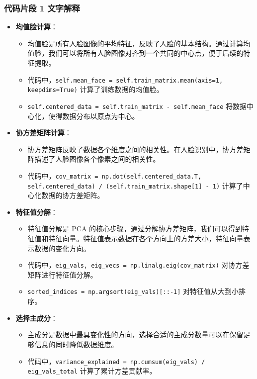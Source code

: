 \documentclass{article}
\begin{document}
\subsubsection{代码片段 1 文字解释}
\begin{itemize}
    \item \textbf{均值脸计算}：
    \begin{itemize}
        \item 均值脸是所有人脸图像的平均特征，反映了人脸的基本结构。通过计算均值脸，我们可以将所有人脸图像对齐到一个共同的中心点，便于后续的特征提取。
        \item 代码中，\texttt{self.mean\_face = self.train\_matrix.mean(axis=1, keepdims=True)} 计算了训练数据的均值脸。
        \item \texttt{self.centered\_data = self.train\_matrix - self.mean\_face} 将数据中心化，使得数据分布以原点为中心。
    \end{itemize}
    \item \textbf{协方差矩阵计算}：
    \begin{itemize}
        \item 协方差矩阵反映了数据各个维度之间的相关性。在人脸识别中，协方差矩阵描述了人脸图像各个像素之间的相关性。
        \item 代码中，\texttt{cov\_matrix = np.dot(self.centered\_data.T, self.centered\_data) / (self.train\_matrix.shape[1] - 1)} 计算了中心化数据的协方差矩阵。
    \end{itemize}
    \item \textbf{特征值分解}：
    \begin{itemize}
        \item 特征值分解是 PCA 的核心步骤，通过分解协方差矩阵，我们可以得到特征值和特征向量。特征值表示数据在各个方向上的方差大小，特征向量表示数据的变化方向。
        \item 代码中，\texttt{eig\_vals, eig\_vecs = np.linalg.eig(cov\_matrix)} 对协方差矩阵进行特征值分解。
        \item \texttt{sorted\_indices = np.argsort(eig\_vals)[::-1]} 对特征值从大到小排序。
    \end{itemize}
    \item \textbf{选择主成分}：
    \begin{itemize}
        \item 主成分是数据中最具变化性的方向，选择合适的主成分数量可以在保留足够信息的同时降低数据维度。
        \item 代码中，\texttt{variance\_explained = np.cumsum(eig\_vals) / eig\_vals\_total} 计算了累计方差贡献率。

\end{itemize}
\end{itemize}
\end{document}
